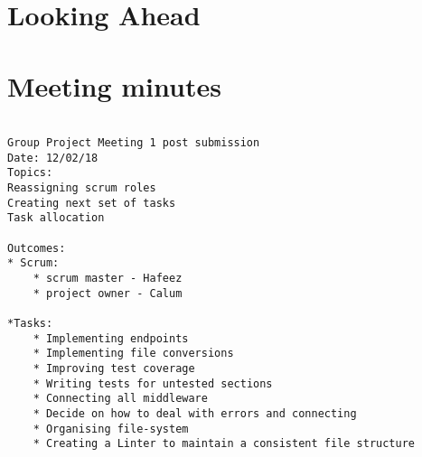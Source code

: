 \documentclass{article}
\begin{document}
\section{Looking Ahead}

\appendix
\section{Meeting minutes}  \label{app:meet}
\begin{lstlisting} 

Group Project Meeting 1 post submission
Date: 12/02/18 
Topics: 
Reassigning scrum roles 
Creating next set of tasks 
Task allocation 

Outcomes:
* Scrum: 
    * scrum master - Hafeez 
    * project owner - Calum 

*Tasks:
    * Implementing endpoints
    * Implementing file conversions 
    * Improving test coverage 
    * Writing tests for untested sections 
    * Connecting all middleware 
    * Decide on how to deal with errors and connecting 
    * Organising file-system 
    * Creating a Linter to maintain a consistent file structure 

\end{lstlisting}
\end{document}
